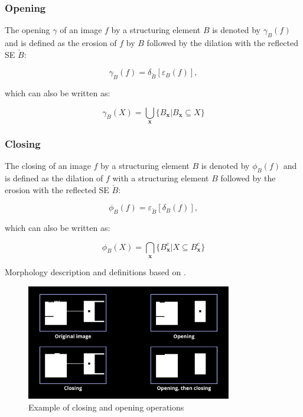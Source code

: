 \subsubsection{Opening}

The opening $\gamma$ of an image $f$ by a structuring element $B$ is denoted by $\gamma_B(f)$ and is defined as the erosion of $f$ by $B$ followed by the dilation with the reflected SE $\check{B}$:

\begin{equation}
    \gamma_B(f) = \delta_{\check{B}} [ \varepsilon_B(f) ],
\end{equation}

which can also be written as:

\begin{equation}
    \gamma_B(X) = \bigcup\limits_{\mathbf{x}} \{ B_\mathbf{x} | B_\mathbf{x} \subseteq X \}
\end{equation}

\subsubsection{Closing}

The closing of an image $f$ by a structuring element $B$ is denoted by $\phi_B(f)$ and is defined as the dilation of $f$ with a structuring element $B$ followed by the erosion with the reflected SE $\check{B}$:

\begin{equation}
    \phi_B(f) = \varepsilon_{\check{B}} [ \delta_B(f) ],
\end{equation}

which can also be written as:

\begin{equation}
    \phi_B(X) = \bigcap\limits_{\mathbf{x}} \{ B_\mathbf{x}^c | X \subseteq B_\mathbf{x}^c \}
\end{equation}

Morphology description and definitions based on \cite{morphology_book}.

\begin{figure}[H]
    \centering
    \includegraphics[width=0.8\textwidth]{Content/Images/opening_closing.png}
    \caption{Example of closing and opening operations}
\end{figure}

